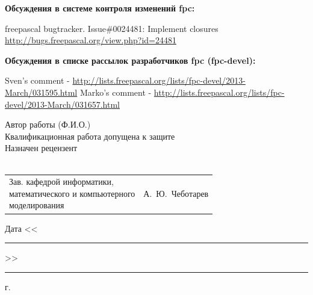 \documentclass{imcs}
\begin{document}
\begin{thebibliography}{99}
  
{\bf Обсуждения в системе контроля изменений fpc:}  
  
 freepascal bugtracker. Issue\#0024481: Implement closures \url{http://bugs.freepascal.org/view.php?id=24481}
  
{\bf Обсуждения в списке рассылок разработчиков fpc (fpc-devel):}

 Sven's comment - \url{http://lists.freepascal.org/lists/fpc-devel/2013-March/031595.html}
 Marko's comment - \url{http://lists.freepascal.org/lists/fpc-devel/2013-March/031657.html}


  
\end{thebibliography}

\pagebreak

\noindent Автор работы  (Ф.И.О.)\\

\noindent{}Квалификационная работа допущена к защите\\

\noindent{}Назначен рецензент\\
\\

\vspace{2\baselineskip}
\noindent\begin{tabular}{p{} p{}}
\parbox{8cm}{Зав. кафедрой информатики,\\ математического и компьютерного\\ моделирования} &
\hfill А.~Ю.~Чеботарев\\
\end{tabular}
\vspace{2\baselineskip}
\begin{flushright}
Дата <<\rule{1cm}{0.5pt}>>\rule{3cm}{0.5pt} г.
\end{flushright}
\end{document}
